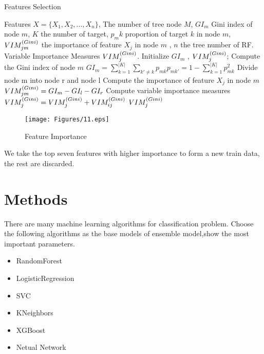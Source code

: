 \begin{algorithm}[htbp]
	\small
	\caption{Features Selection}
	\label{alg:features_selection}
	\begin{algorithmic}[1]
		\REQUIRE
		Features $X=\{ X_1, X_2, ... , X_n \}$,
		The number of tree node $M$,
		$GI_m$ Gini index of node $m$, 
		$ K $ the number of target,
		$ p_mk $ proportion of target $k$ in node $m$,
		$ VIM_{jm}^{\small(Gini)} $ the importance of feature $X_j$ in node $m$ ,
		$ n$ the tree number of RF.
		\ENSURE
		Variable Importance Measures $VIM_{j}^{\small(Gini)}$.
		\STATE
		Initialize $GI_m$ , 
		$VIM_{j}^{\small(Gini)} $;
		\STATE Compute the Gini index of node $m$
		$GI_m = \sum_{k=1}^{|K|} \sum_{k'\neq k} {p_{mk}}{p_{mk'}}=1- \sum_{k=1}^{|K|} p^2_{mk}$
		\ENDFOR
		\STATE Divide node m into node r and node l
		\STATE Compute the importance of feature $X_j$ in node $m$ 
		$VIM_{jm}^{\small(Gini)} = GI_m-GI_l-GI_r $
		\ENDFOR
		\STATE Compute variable importance measures 
		$VIM_{j}^{\small(Gini)} = VIM_{j}^{\small(Gini)} + VIM_{ij}^{\small(Gini)}$
		\ENDFOR
		\RETURN $VIM_{j}^{\small(Gini)}$
	\end{algorithmic}
\end{algorithm}

\begin{figure}[htbp]
	\centering
	\texttt{[image: Figures/11.eps]}
	\caption{Feature Importance}\label{fig:feature_importance}
\end{figure}

We take the top seven features 
with higher importance 
to form a new train data, the rest are discarded.


\section{Methods}

There are many machine learning algorithms 
for classification problem. 
Choose the following algorithms
as the base models of ensemble model,show the most important parameters.

\begin{itemize}
	\item RandomForest 
	\item LogisticRegression
	\item SVC
	\item KNeighbors 
	\item XGBoost
	\item Netual Network
\end{itemize}
